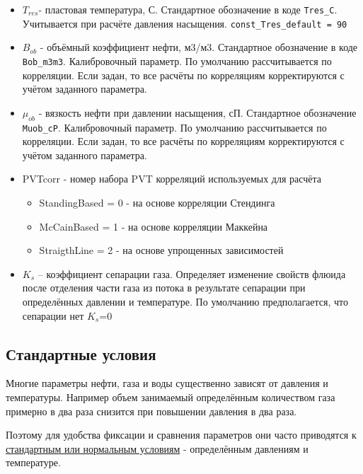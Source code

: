 \documentclass[]{scrreprt}
\begin{document}
\begin{itemize}
\item $T_{res}$- пластовая температура, С. Стандартное обозначение в коде \texttt{Tres_C}. Учитывается при расчёте давления насыщения. \texttt{const_Tres_default = 90}

\item $B_{ob}$ - объёмный коэффициент нефти, м3/м3. Стандартное обозначение в коде \texttt{Bob_m3m3}. Калибровочный параметр. По умолчанию рассчитывается по корреляции. Если задан, то все расчёты по корреляциям корректируются с учётом заданного параметра.

\item $\mu_{ob}$ - вязкость нефти при давлении насыщения, сП. Стандартное обозначение \texttt{Muob_cP}. Калибровочный параметр. По умолчанию рассчитывается по корреляции. Если задан, то все расчёты по корреляциям корректируются с учётом заданного параметра.

\item PVTcorr - номер набора PVT корреляций используемых для расчёта

\begin{itemize}	
	\item 	StandingBased = 0 - на основе корреляции Стендинга
	\item 	McCainBased = 1 - на основе корреляции Маккейна
	\item 	StraigthLine = 2 - на основе упрощенных зависимостей
\end{itemize}

\item $K_s$ – коэффициент сепарации газа. Определяет изменение свойств флюида после отделения части газа из потока в результате сепарации при определённых давлении и температуре. По умолчанию предполагается, что сепарации нет $K_s$=0

\end{itemize}

\subsection{Стандартные условия} 
Многие параметры нефти, газа и воды существенно зависят от давления и температуры. Например объем занимаемый определённым количеством газа примерно в два раза снизится при повышении давления в два раза. 

Поэтому для удобства фиксации и сравнения параметров они часто приводятся к \href{https://ru.wikipedia.org/wiki/%D0%A1%D1%82%D0%B0%D0%BD%D0%B4%D0%B0%D1%80%D1%82%D0%BD%D1%8B%D0%B5_%D1%83%D1%81%D0%BB%D0%BE%D0%B2%D0%B8%D1%8F}{стандартным или нормальным условиям} - определённым давлениям и температуре. 
	
\end{document}
